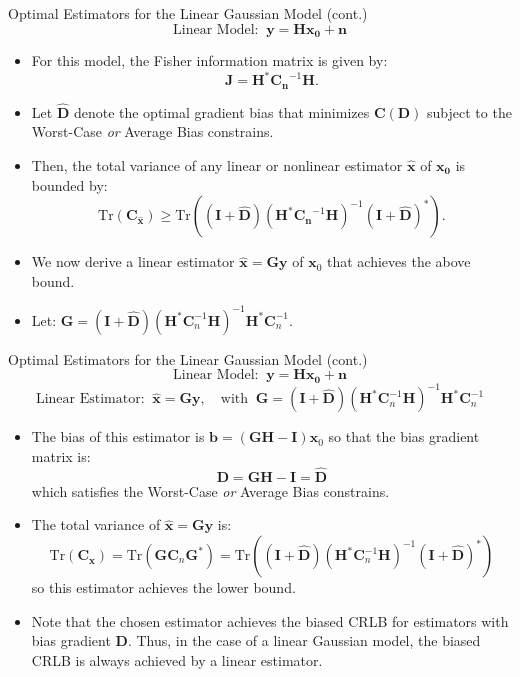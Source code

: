 \documentclass{beamer}
\begin{document}
\begin{frame}{Optimal Estimators for the Linear Gaussian Model (cont.)}
\[ \text{Linear Model: } \ \mathbf{y} = \mathbf{H} \mathbf{x_0} + \mathbf{n} \]

\begin{itemize}
    \item For this model, the Fisher information matrix is given by:
        \[ \mathbf{J} = \mathbf{H}^*\mathbf{C_n}^{-1}\mathbf{H}. \]
    \item Let \( \hat{\mathbf{D}} \) denote the optimal gradient bias that minimizes \( \mathbf{C}(\mathbf{D}) \) subject to the Worst-Case \textit{or} Average Bias constrains. 
    \item Then, the total variance of any linear or nonlinear estimator \( \hat{\mathbf{x}} \) of \( \mathbf{x_0} \) is bounded by:
        \[ \text{Tr}(\mathbf{C_{\hat{x}}}) \geq \text{Tr}\left((\mathbf{I} + \hat{\mathbf{D}}) (\mathbf{H}^*\mathbf{C_n}^{-1}\mathbf{H})^{-1}(\mathbf{I} + \hat{\mathbf{D}})^*\right). \]
    \item We now derive a linear estimator \(\hat{\mathbf{x}} = \mathbf{G} \mathbf{y}\) of \(\mathbf{x}_0\) that achieves the above bound.
    \item Let: $\mathbf{G} = (\mathbf{I} + \hat{\mathbf{D}})(\mathbf{H}^* \mathbf{C}_n^{-1} \mathbf{H})^{-1} \mathbf{H}^* \mathbf{C}_n^{-1}.$
\end{itemize}
\end{frame}


\begin{frame}{Optimal Estimators for the Linear Gaussian Model (cont.)}
\[ \text{Linear Model: } \ \mathbf{y} = \mathbf{H} \mathbf{x_0} + \mathbf{n} \]
\[ \text{Linear Estimator: } \ \hat{\mathbf{x}} = \mathbf{G} \mathbf{y}, \quad \text{with } \  \mathbf{G} = (\mathbf{I} + \hat{\mathbf{D}})(\mathbf{H}^* \mathbf{C}_n^{-1} \mathbf{H})^{-1} \mathbf{H}^* \mathbf{C}_n^{-1}\]

\begin{itemize}
    \item The bias of this estimator is \(\mathbf{b} = (\mathbf{GH} - \mathbf{I}) \mathbf{x}_0\) so that the bias gradient matrix is:
        \[\mathbf{D} = \mathbf{GH} - \mathbf{I} = \hat{\mathbf{D}}\]
        which satisfies the Worst-Case \textit{or} Average Bias constrains.
    \item The total variance of \(\hat{\mathbf{x}} = \mathbf{G} \mathbf{y}\) is:
        \[\text{Tr}(\mathbf{C}_{\hat{\mathbf{x}}} ) = \text{Tr}(\mathbf{G} \mathbf{C}_n \mathbf{G}^*)
        = \text{Tr}\left((\mathbf{I} + \hat{\mathbf{D}})(\mathbf{H}^* \mathbf{C}_n^{-1} \mathbf{H})^{-1}(\mathbf{I} + \hat{\mathbf{D}})^*\right)\]
        so this estimator achieves the lower bound.  
    \item Note that the chosen estimator achieves the biased CRLB for estimators with bias gradient \(\mathbf{D}\). Thus, in the case of a linear Gaussian model, the biased CRLB is always achieved by a linear estimator.
\end{itemize}
\end{frame}
\end{document}
